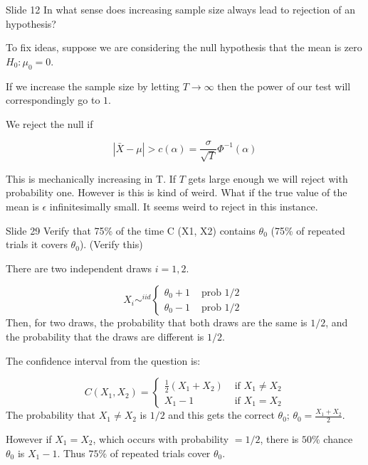 \documentclass{article}
\begin{document}
\begin{problem}{Slide 12}
In what sense does increasing sample size always lead to rejection of an hypothesis?
\end{problem}

To fix ideas, suppose we are considering the null hypothesis that the mean is zero $H_0: \mu_0 = 0$.

If we increase the sample size by letting $T\rightarrow \infty$ then the power of our test will correspondingly go to $1$.

We reject the null if 

$$
|\bar{X}-\mu|>c(\alpha)=\frac{\sigma}{\sqrt{T}} \Phi^{-1}(\alpha)
$$

This is mechanically increasing in T. If $T$ gets large enough we will reject with probability one. However is this is kind of weird. What if the true value of the mean is $\epsilon$ infinitesimally small. It seems weird to reject in this instance. 
 

\begin{problem}{Slide 29}
Verify that 75\% of the time C (X1, X2) contains $\theta_0$ (75\% of repeated trials it covers $\theta_0$). (Verify this)
\end{problem}

There are two independent draws $i=1,2$.

$$
X_{i} \sim^{iid} \begin{cases}\theta_{0}+1 & \text { prob 1/2 } \\ \theta_{0}-1 & \text { prob } 1 / 2\end{cases}
$$
Then, for two draws, the probability that both draws are the same is $1 / 2$, and the probability that the draws are different is $1 / 2$. 

The confidence interval from the question is:
 
$$
C\left(X_{1}, X_{2}\right)= \begin{cases}\frac{1}{2}\left(X_{1}+X_{2}\right) & \text { if } X_{1} \neq X_{2} \\ X_{1}-1 & \text { if } X_{1}=X_{2}\end{cases}
$$
The probability that $X_{1} \neq X_{2}$ is $1 / 2$ and this gets the correct $\theta_0$; $\theta_{0}=\frac{X_{1}+X_{2}}{2}$. 

However if $X_{1}=X_{2}$, which occurs with probability $=1 / 2$, there is $50 \%$ chance $\theta_{0}$ is $X_{1}-1$. Thus $75 \%$ of repeated trials cover $\theta_{0}$.
\end{document}
